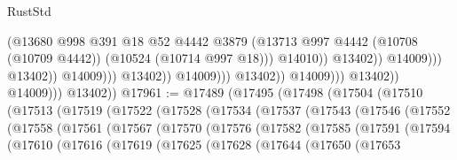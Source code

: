 \begin{lexlean}{RustStd}
\begin{coremodule}
                                                            (@13680
                                                              @998
                                                              @391
                                                              @18
                                                              @52
                                                              @4442
                                                              @3879
                                                              (@13713
                                                                @997
                                                                @4442
                                                                (@10708 (@10709 @4442))
                                                                (@10524 (@10714 @997 @18)))
                                                              @14010))
                                                          @13402))
                                                      @14009)))
                                                @13402))
                                            @14009)))
                                      @13402))
                                  @14009)))
                            @13402))
                        @14009)))
                  @13402))
              @14009)))
        @13402))
@17961 := @17489
    (@17495
      (@17498
        (@17504
          (@17510
            (@17513
              (@17519
                (@17522
                  (@17528
                    (@17534
                      (@17537
                        (@17543
                          (@17546
                            (@17552
                              (@17558
                                (@17561
                                  (@17567
                                    (@17570
                                      (@17576
                                        (@17582
                                          (@17585
                                            (@17591
                                              (@17594
                                                (@17610
                                                  (@17616
                                                    (@17619
                                                      (@17625
                                                        (@17628
                                                          (@17644
                                                            (@17650
                                                              (@17653

\end{coremodule}
\end{lexlean}
